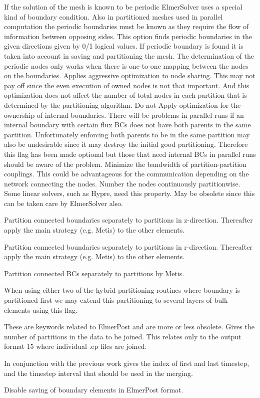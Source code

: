 If the solution of the mesh is known to be periodic ElmerSolver uses
a special kind of boundary condition. Also in partitioned meshes
used in parallel computation the periodic boundaries must be known
as they require the flow of information between opposing sides.
This option finds periodic boundaries in the given directions 
given by 0/1 logical values. If periodic boundary is found it is taken into
account in saving and partitioning the mesh.
The determination of the periodic nodes only works when there is one-to-one mapping
between the nodes on the boundaries. 
%
Applies aggressive optimization to node sharing. This may not pay off since the even execution
of owned nodes is not that important. And this optimization does not affect the number of total
nodes in each partition that is determined by the partitioning algorithm. 
%
Do not Apply optimization for the ownership of internal boundaries. There will be problems in parallel runs if an 
internal boundary with certain flux BCs does not have both parents in the same partition. Unfortunately 
enforcing both parents to be in the same partition may also be undesirable since it may destroy the initial 
good partitioning. Therefore this flag has been made optional but those that need internal BCs in parallel
runs should be aware of the problem. 
%
Minimize the bandwidth of partition-partition couplings. This could be advantageous for the 
communication depending on the network connecting the nodes. 
%
Number the nodes continuously partitionwise. Some linear solvers, such as Hypre, need this 
property. May be obsolete since this can be taken care by ElmerSolver also. 

Partition connected boundaries separately to partitions in z-direction. Thereafter apply the main 
strategy (e.g. Metis) to the other elements. 

Partition connected boundaries separately to partitions in r-direction. Thereafter apply the main 
strategy (e.g. Metis) to the other elements. 

Partition connected BCs separately to partitions by Metis.

When using either two of the hybrid partitioning routines where boundary is partitioned first we may extend this
partitioning to several layers of bulk elements using this flag. 
\sifend


These are keywords related to ElmerPost and are more or less obsolete. 
\sifbegin
{}
Gives the number of partitions in the data to be joined. This relates only to the output format 
15 where individual .ep files are joined. 

In conjunction with the previous work gives the index of first and last timestep, and the
timestep interval that should be used in the merging. 

Disable saving of boundary elements in ElmerPost format.
\sifend



